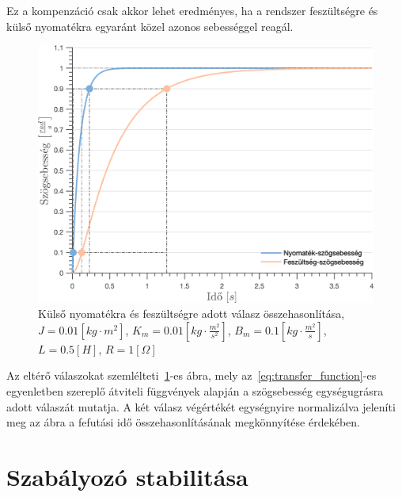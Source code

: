 


Ez a kompenzáció
csak akkor lehet eredményes, ha a rendszer feszültségre és külső nyomatékra 
egyaránt közel azonos sebességgel reagál.
\begin{figure}[ht]
    \begin{center}
    \includegraphics[width=\textwidth]{images/step_response.png}
    \caption{Külső nyomatékra és feszültségre adott válasz összehasonlítása, 
    $J = 0.01 \left[kg\cdot m^2\right]$,
    $K_m = 0.01 \left[kg\cdot \frac{m^2}{s^2}\right]$,
    $B_m = 0.1 \left[kg\cdot \frac{m^2}{s}\right]$,
    $L = 0.5 \left[H\right]$,
    $R = 1 \left[\Omega\right]$}\label{fig:step_response}
    \end{center}
\end{figure}
Az eltérő válaszokat 
szemlélteti~\ref{fig:step_response}-es ábra, mely az~\eqref{eq:transfer_function}-es
egyenletben szereplő átviteli függvények alapján a szögsebesség egységugrásra adott válaszát mutatja. 
A két válasz végértékét egységnyire normalizálva jeleníti meg az ábra a fefutási idő 
összehasonlításának megkönnyítése érdekében. 

\section{Szabályozó stabilitása}